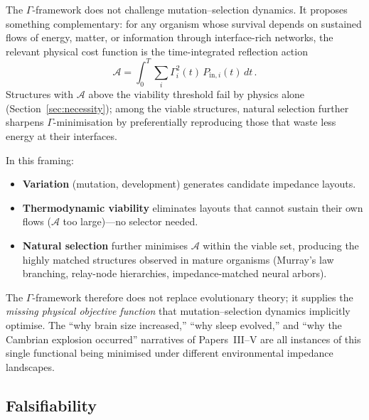 \documentclass[aps,pre,twocolumn,superscriptaddress,floatfix]{revtex4-2}
\begin{document}
The $\Gamma$-framework does not challenge mutation--selection
dynamics.  It proposes something complementary: for any
organism whose survival depends on sustained flows of
energy, matter, or information through interface-rich
networks, the relevant physical cost function is the
time-integrated reflection action
\begin{equation}
  \mathcal{A} = \int_0^T \sum_i \Gamma_i^2(t)\,
  P_{\text{in},i}(t)\,dt\,.
  \label{eq:action-evo}
\end{equation}
Structures with $\mathcal{A}$ above the viability threshold
fail by physics alone (Section~\ref{sec:necessity});
among the viable structures, natural selection further
sharpens $\Gamma$-minimisation by preferentially reproducing
those that waste less energy at their interfaces.

In this framing:
\begin{itemize}
  \item \textbf{Variation} (mutation, development) generates
    candidate impedance layouts.
  \item \textbf{Thermodynamic viability} eliminates
    layouts that cannot sustain their own flows
    ($\mathcal{A}$ too large)---no selector needed.
  \item \textbf{Natural selection} further minimises
    $\mathcal{A}$ within the viable set, producing the
    highly matched structures observed in mature organisms
    (Murray's law branching, relay-node hierarchies,
    impedance-matched neural arbors).
\end{itemize}
The $\Gamma$-framework therefore does not replace
evolutionary theory; it supplies the \emph{missing
physical objective function} that mutation--selection
dynamics implicitly optimise.  The ``why brain size
increased,'' ``why sleep evolved,'' and ``why the
Cambrian explosion occurred'' narratives of
Papers~III--V are all instances of this single
functional being minimised under different environmental
impedance landscapes.

\subsection{Falsifiability}
\end{document}
